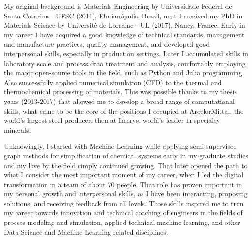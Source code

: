 My original background is Materials Engineering by Universidade Federal de Santa Catarina - UFSC (2011), Florianópolis, Brazil, next I received my PhD in Materials Science by Université de Lorraine - UL (2017), Nancy, France. Early in my career I have acquired a good knowledge of technical standards, management and manufacture practices, quality management, and developed good interpersonal skills, especially in production settings. Later I accumulated skills in laboratory scale and process data treatment and analysis, comfortably employing the major open-source tools in the field, such as Python and Julia programming. Also successfully applied numerical simulation (CFD) to the thermal and thermochemical processing of materials. This was possible thanks to my thesis years (2013-2017) that allowed me to develop a broad range of computational skills, what came to be the core of the positions I occupied at ArcelorMittal, the world's largest steel producer, then at Imerys, world's leader in specialty minerals.
%
\par\vskip6pt%
%
Unknowingly, I started with Machine Learning while applying semi-supervised graph methods for simplification of chemical systems early in my graduate studies and my love by the field simply continued growing. That later opened the path to what I consider the most important moment of my career, when I led the digital transformation in a team of about 70 people. That role has proven important in my personal growth and interpersonal skills, as I have been interacting, proposing solutions, and receiving feedback from all levels. Those skills inspired me to turn my career towards innovation and technical coaching of engineers in the fields of process modeling and simulation, applied technical machine learning, and other Data Science and Machine Learning related disciplines.

\endinput%